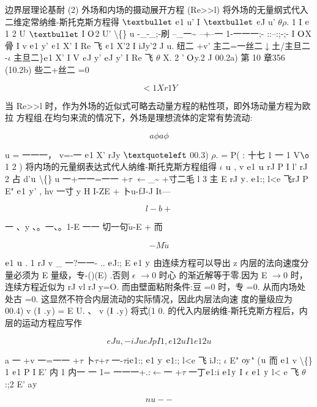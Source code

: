 边界层理论基耐 (2) 外场和内场的摄动展开方程 (Re>>l) 将外场的无量纲式代入二维定常纳维-斯托克斯方程得 ${\rm •}$ ${\rm e}$1 u' I ${\rm •}$ ${\rm e}$J u' $\theta$$\rho$. 1 I ${\rm e}$1 2 U ${\rm •}$ I ${\rm O}$2 U' \textbackslash\{\} u -\_-\_;-刷 --\_一\textasciitilde{} --+--一 1-一一一;- ::--:;-;- I ${\rm O}$X 骨 I v ${\rm e}$1 y' ${\rm e}$1 X' I Re 飞 ${\rm e}$1 X'2 I iJy'2 J u. 纽二 +v' 主二=一丝二$\downarrow$土/主旦二 -$\iota$ 主旦二\}${\rm e}$1 X' I V ${\rm e}$J y' ${\rm e}$J y' I Re 飞 $\theta$ X. 2 ' ${\rm O}$y.2 J 00.2a) 第 10 章356 (10.2b) 些二+丝二 =0

\[<1X r1 Y\]

当 Re>>l 时，作为外场的近似式可略去动量方程的粘性项，即外场动量方程为欧拉 方程组.在均匀来流的情况下，外场是理想流体的定常有势流动:

\[a\phi a\phi \]

u = 一一一， v=-一 ${\rm e}$1 X' rJy ${\rm ‘}$ 00.3) $\rho$. = P( : 十七 1 一 1 V${\rm ø}$ 1 2 ) 将内场的元量纲表达式代人纳维-斯托克斯方程组得 $\iota$ ${\rm u}$ , v ${\rm e}$1 ${\rm u}$ rJ P I l' rJ 2 占 d'${\rm u}$ \textbackslash\{\} u 一+一一=一一 +$\tau$ $\leftarrow$\_\textasciitilde{} +寸二毛 l 3 主 E rJ ${\rm y}$. ${\rm e}$1:; l<e 飞rJ P E" ${\rm e}$1 ${\rm y}$' , hv 一寸 y H I-ZE + 卜u-fJ-J It---

\[l-b +\]

一 、y 、。一、。1-E 一一 切一句$\tilde{u}$-E + 而

\[-M\tilde{u}\]

${\rm e}$1 ${\rm u}$ . 1 rJ v \_ 一?一一- .. ${\rm e}$J:; E ${\rm e}$1 ${\rm y}$ 由连续方程可以导出 z 内层的法向速度分量必须为 E 量级，专-()(E) .否则 $\epsilon$ $\rightarrow$0 时心 的渐近解等于零.因为 E $\rightarrow$0 时，连续方程近似为 rJ vl rJ y=O. 而由壁面粘附条件:豆 =0 时，专 =0. 从而内场处处古 =0. 这显然不符合内层流动的实际情况，因此内层法向速 度的量级应为 00.4) v (${\rm I}$ .${\rm y}$) = E U. 、 v (${\rm I}$ .${\rm y}$) 将式(1 0. 的代入内层纳维-斯托克斯方程后，内层的运动方程应写作

\[eJ u , - iJ u eJ p I 1 ,e12 u I 1 e1 2 u  \]

a 一 +v 一=一一 +$\tau$ 卜$\tau$+$\tau$ 一-$\tau$i${\rm e}$1:; ${\rm e}$1 ${\rm y}$ ${\rm e}$1:; l<e 飞 iJ:; $\iota$ E" ${\rm oy}$" (${\rm u}$ 而 ${\rm e}$1 v \textbackslash\{\} 1 ${\rm e}$1 P I E' 内 1 内一 一 1= 一一一+.:$\leftarrow$一 +$\tau$ 一丁${\rm e}$1:i ${\rm e}$1${\rm y}$ I $\epsilon$ ${\rm e}$1 ${\rm y}$ l< e 飞 $\theta$:;2 E' a${\rm y}$

\[nu --\]

